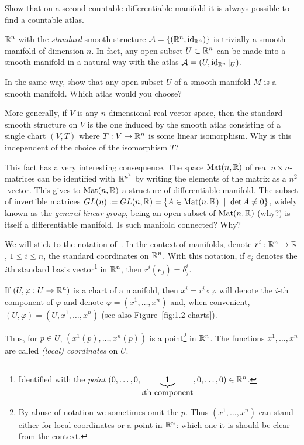 \begin{exercise}
  Show that on a second countable differentiable manifold it is always possible to find a countable atlas.
\end{exercise}

\begin{exercise}\label{exe:subsetsmanifolds}
  $\mathbb{R}^n$ with the \emph{standard} smooth structure $\mathcal{A}=\{(\mathbb{R}^n, \operatorname{id}_{\mathbb{R}^n})\}$ is trivially a smooth manifold of dimension $n$.
  In fact, any open subset $U\subset\mathbb{R}^n$ can be made into a smooth manifold in a natural way with the atlas $\mathcal{A}=(U, \operatorname{id}_{\mathbb{R}^n}|_U)$.

  In the same way, show that any open subset $U$ of a smooth manifold $M$ is a smooth manifold.
  Which atlas would you choose?

  More generally, if $V$ is any $n$-dimensional real vector space, then the standard smooth structure on $V$ is the one induced by the smooth atlas consisting of a single chart $(V, T)$ where $T: V \to \mathbb{R}^n$ is some linear isomorphism.
  Why is this independent of the choice of the isomorphism $T$?

  This fact has a very interesting consequence.
  The space $\mathrm{Mat}(n, \mathbb{R})$ of real $n\times n$-matrices can be identified with $\mathbb{R}^{n^2}$ by writing the elements of the matrix as a $n^2$-vector.
  This gives to $\mathrm{Mat}(n, \mathbb{R})$ a structure of differentiable manifold.
  The subset of invertible matrices $GL(n) := GL(n, \mathbb{R}) = \{ A \in \mathrm{Mat}(n, \mathbb{R}) \;\mid\; \det A \neq 0\}$, widely known as the \emph{general linear group}, being an open subset of $\mathrm{Mat}(n, \mathbb{R})$ (why?) is itself a differentiable manifold.
  Is such manifold connected? Why?
\end{exercise}

\vspace{1em}
\begin{notation}\label{ntn:coords}
  We will stick to the notation of~\cite{book:tu}.
  In the context of manifolds, denote $r^i: \mathbb{R}^n\to\mathbb{R}$, $1\leq i\leq n$, the standard coordinates on $\mathbb{R}^n$.
  With this notation, if $e_i$ denotes the $i$th standard basis vector\footnote{Identified with the \emph{point} $(0,\ldots,0,\LaTeXunderbrace{1}_{i\mbox{th component}},0,\ldots,0) \in\R^n$.} in $\mathbb{R}^n$, then $r^i(e_j) = \delta^i_j$.

  If $(U, \varphi:U\to\mathbb{R}^n)$ is a chart of a manifold, then $x^i = r^i\circ\varphi$ will denote the $i$-th component of $\varphi$ and denote $\varphi = (x^1, \ldots, x^n)$ and, when convenient, $(U,\varphi) = (U, x^1, \ldots, x^n)$ (see also Figure~\ref{fig:1.2-charts}).

  Thus, for $p\in U$, $(x^1(p), \ldots, x^n(p))$ is a point\footnote{By abuse of notation we sometimes omit the $p$.
    Thus $(x^1, \ldots, x^n)$ can stand either for local coordinates or a point in $\mathbb{R}^n$: which one it is should be clear from the context.} in $\mathbb{R}^n$.
  The functions $x^1, \ldots, x^n$  are called \emph{(local) coordinates} on $U$.
\end{notation}
\vspace{1em}

